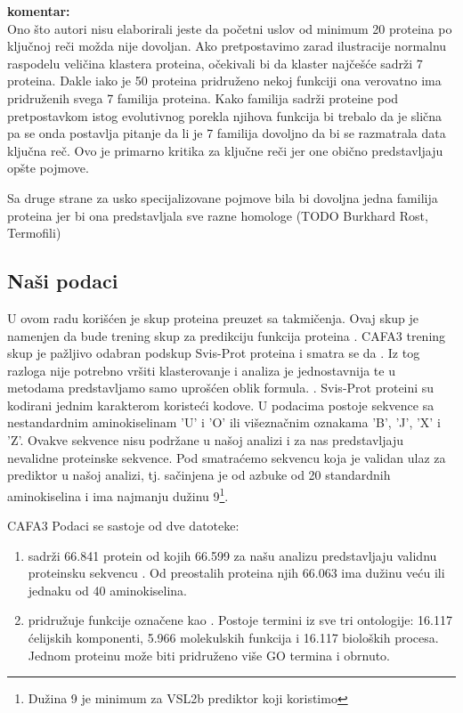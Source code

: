\textbf{komentar:} \\
Ono što autori nisu elaborirali jeste da početni uslov od minimum 20 proteina
po ključnoj reči možda nije dovoljan. Ako pretpostavimo zarad ilustracije
normalnu raspodelu veličina klastera proteina, očekivali bi da klaster najčešće
sadrži 7 proteina. Dakle iako je 50 proteina pridruženo nekoj funkciji ona
verovatno ima pridruženih svega 7 familija proteina. Kako familija sadrži
proteine pod pretpostavkom istog evolutivnog porekla njihova funkcija bi
trebalo da je slična pa se onda postavlja pitanje da li je 7 familija dovoljno
da bi se razmatrala data ključna reč. Ovo je primarno kritika za ključne reči
jer one obično predstavljaju opšte pojmove.

Sa druge strane za usko specijalizovane pojmove bila bi dovoljna jedna familija
proteina jer bi ona predstavljala sve razne homologe (TODO Burkhard Rost,
Termofili)

\subsection{Naši podaci}

U ovom radu korišćen je skup proteina preuzet sa  takmičenja.
Ovaj skup je namenjen da bude trening skup za predikciju funkcija proteina
\parencite{CAFA}.  CAFA3 trening skup je pažljivo odabran podskup Svis-Prot
proteina i smatra se da  \parencite{??}.
Iz tog razloga nije potrebno vršiti klasterovanje i analiza je jednostavnija te
u metodama predstavljamo samo uprošćen oblik formula.  .  Svis-Prot proteini su
kodirani jednim karakterom koristeći  kodove.  U podacima
postoje sekvence sa nestandardnim aminokiselinam 'U' i 'O' ili višeznačnim
oznakama 'B', 'J', 'X' i 'Z'.  Ovakve sekvence nisu podržane u našoj analizi i
za nas predstavljaju nevalidne proteinske sekvence. Pod  smatraćemo sekvencu koja je validan ulaz za prediktor u
našoj analizi, tj. sačinjena je od azbuke od 20 standardnih aminokiselina i ima
najmanju dužinu 9\footnote{ Dužina 9 je minimum za VSL2b prediktor koji
koristimo}.

CAFA3 Podaci se sastoje od dve datoteke:
\begin{enumerate}
  \item {}  sadrži 66.841 protein od kojih 66.599
    za našu analizu predstavljaju validnu proteinsku sekvencu . Od preostalih
    proteina njih 66.063 ima dužinu veću ili jednaku od 40 aminokiselina.
  \item {} pridružuje funkcije označene kao
     . Postoje termini iz sve tri
    ontologije: 16.117 ćelijskih komponenti, 5.966 molekulskih funkcija i 16.117
    bioloških procesa. Jednom proteinu može biti pridruženo više GO termina i
    obrnuto.
\end{enumerate}


